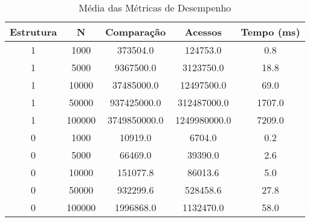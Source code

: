 \begin{table}[htbp]
\caption{Média das Métricas de Desempenho}
\label{tab:table1}
\begin{tabular}{c|c|c|c|c}
\textbf{Estrutura} & \textbf{N} & \textbf{Comparação} & \textbf{Acessos} & \textbf{Tempo (ms)}\\
\hline
1 & 1000 & 373504.0 & 124753.0 & 0.8\\
1 & 5000 & 9367500.0 & 3123750.0 & 18.8\\
1 & 10000 & 37485000.0 & 12497500.0 & 69.0\\
1 & 50000 & 937425000.0 & 312487000.0 & 1707.0\\
1 & 100000 & 3749850000.0 & 1249980000.0 & 7209.0\\
0 & 1000 & 10919.0 & 6704.0 & 0.2\\
0 & 5000 & 66469.0 & 39390.0 & 2.6\\
0 & 10000 & 151077.8 & 86013.6 & 5.0\\
0 & 50000 & 932299.6 & 528458.6 & 27.8\\
0 & 100000 & 1996868.0 & 1132470.0 & 58.0\\
\end{tabular}
\end{table}
